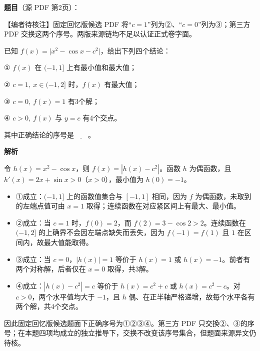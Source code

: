 \begin{answer}

\textbf{题目}（源 PDF 第2页）：

\begin{gktip}
【编者待核注】固定回忆版候选 PDF 将“\(c=1\)”列为②、“\(c=0\)”列为③；第三方 PDF 交换这两个序号。两版来源链均不足以认证正式卷字面。
\end{gktip}

已知 \(f(x)=\lvert x^2-\cos x-c^2\rvert\)，给出下列四个结论：

① \(f(x)\) 在 \((-1,1]\) 上有最小值和最大值；

② \(c=1,\ x\in(-1,2]\) 时，\(f(x)\) 有最大值；

③ \(c=0,\ f(x)=1\) 有3个解；

④ \(c>0,\ f(x)\) 与 \(y=c\) 有4个交点。

其中正确结论的序号是\(\underline{\qquad}\)。

\textbf{解析}

令 \(h(x)=x^2-\cos x\)，则 \(f(x)=|h(x)-c^2|\)。函数 \(h\) 为偶函数，且 \(h'(x)=2x+\sin x>0\)（\(x>0\)），最小值为 \(h(0)=-1\)。

\begin{itemize}
\item ①成立：\((-1,1]\) 上的函数值集合与 \([-1,1]\) 相同，因为 \(f\) 为偶函数，未取到的左端点值可由 \(x=1\) 取得；连续函数在对应紧区间上有最大、最小值。
\item ②成立：当 \(c=1\) 时，\(f(0)=2\)，而 \(f(2)=3-\cos2>2\)。连续函数在 \((-1,2]\) 的上确界不会因左端点缺失而丢失，因为 \(f(-1)=f(1)\) 且 \(1\) 在区间内，故最大值能取得。
\item ③成立：当 \(c=0\)，\(|h(x)|=1\) 等价于 \(h(x)=1\) 或 \(h(x)=-1\)。前者有两个对称解，后者仅在 \(x=0\) 取得，共3解。
\item ④成立：\(|h(x)-c^2|=c\) 等价于 \(h(x)=c^2+c\) 或 \(h(x)=c^2-c\)。对 \(c>0\)，两个水平值均大于 \(-1\)，且 \(h\) 偶、在正半轴严格递增，故每个水平各有两个解，共4个交点。
\end{itemize}

因此固定回忆版候选题面下正确序号为①②③④。第三方 PDF 只交换②、③的序号；在本题四项均成立的独立推导下，交换不改变该序号集合，但题面来源异文仍待核。


\end{answer}

